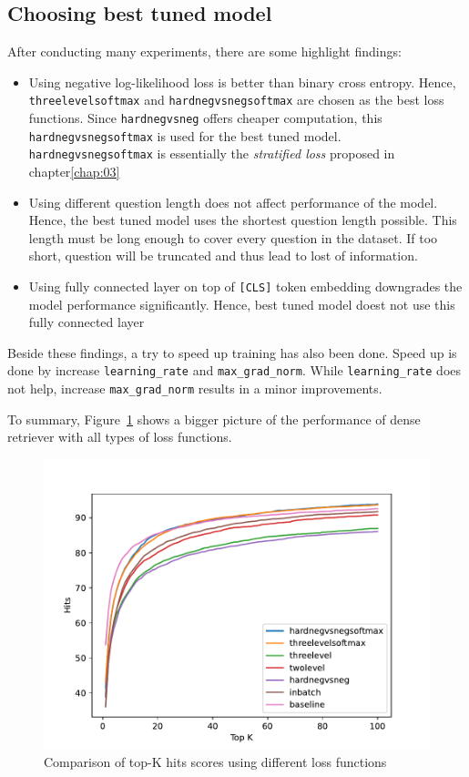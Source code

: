 \documentclass[12pt, sort&compress]{report}
\begin{document}
\subsection{Choosing best tuned model}
\label{sec:4.4.4}
After conducting many experiments, there are some highlight findings:
\begin{itemize}
	\item Using negative log-likelihood loss is better than binary cross entropy. Hence, {\tt threelevelsoftmax} and {\tt hardnegvsnegsoftmax} are chosen as the best loss functions. Since {\tt hardnegvsneg} offers cheaper computation, this {\tt hardnegvsnegsoftmax} is used for the best tuned model. {\tt hardnegvsnegsoftmax} is essentially the \textit{stratified loss} proposed in chapter\ref{chap:03}
	\item Using different question length does not affect performance of the model. Hence, the best tuned model uses the shortest question length possible. This length must be long enough to cover every question in the dataset. If too short, question will be truncated and thus lead to lost of information.
	\item Using fully connected layer on top of {\tt [CLS]} token embedding downgrades the model performance significantly. Hence, best tuned model doest not use this fully connected layer 
\end{itemize}
\par Beside these findings, a try to speed up training has also been done. Speed up is done by increase {\tt learning\_rate} and {\tt max\_grad\_norm}. While {\tt learning\_rate} does not help, increase {\tt max\_grad\_norm} results in a minor improvements.
\par To summary, Figure~\ref{fig:21} shows a bigger picture of the performance of dense retriever with all types of loss functions.
\begin{figure}
	\centering
	\includegraphics[scale=.7]{images/PDF/experiments/K_hits.pdf}
	\caption{Comparison of top-K hits scores using different loss functions}
	\label{fig:21}
\end{figure}
\end{document}
